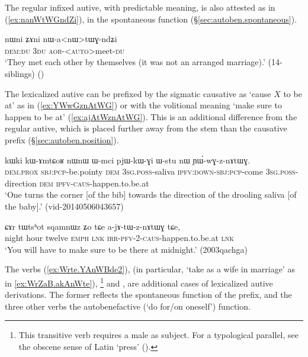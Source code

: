 The regular infixed autive, with predictable meaning, is also attested as in  (\ref{ex:nanWtWGndZi}), in the spontaneous function (§\ref{sec:autoben.spontaneous}).

\begin{exe}
\ex \label{ex:nanWtWGndZi}
\gll nɯni ʑɤni nɯ-a<nɯ>tɯɣ-ndʑi \\
\textsc{dem}:\textsc{du} \textsc{3du}
\textsc{aor}-<\textsc{auto}>meet-\textsc{du} \\
\glt `They met each other by themselves (it was not an arranged marriage).' (14-siblings) ()
\end{exe}

The lexicalized autive  can be prefixed by the sigmatic causative as  `cause $X$ to be at' as in (\ref{ex:YWwGznAtWG}) or with the volitional meaning `make sure to happen to be at' (\ref{ex:ajAtWznAtWG}). This is an additional difference from the regular autive, which is placed further away from the stem than the causative prefix (§\ref{sec:autoben.position}).

\begin{exe}
\ex \label{ex:YWwGznAtWG}
\gll kɯki kɯ-ɤmtɕoʁ nɯnɯ ɯ-mci pjɯ-kɯ-ɣi ɯ-stu nɯ ɲɯ́-wɣ-z-nɤtɯɣ. \\
\textsc{dem}.\textsc{prox} \textsc{sbj}:\textsc{pcp}-be.pointy \textsc{dem} \textsc{3sg}.\textsc{poss}-saliva \textsc{ipfv}:\textsc{down}-\textsc{sbj}:\textsc{pcp}-come \textsc{3sg}.\textsc{poss}-direction \textsc{dem} \textsc{ipfv}-\textsc{caus}-happen.to.be.at \\
\glt `One turns the corner [of the bib] towards the direction of the drooling saliva [of the baby].' (vid-20140506043657)
\end{exe}

\begin{exe}
\ex \label{ex:ajAtWznAtWG}
\gll ɕɤr tɯtsʰot sqamnɯz ʑo tɕe a-jɤ-tɯ-z-nɤtɯɣ tɕe, \\
 night hour twelve \textsc{emph} \textsc{lnk}  \textsc{irr}-\textsc{pfv}-2-\textsc{caus}-happen.to.be.at \textsc{lnk} \\
\glt `You will have to make sure to be there at midnight.' (2003qachga)
\end{exe}
 

The verbs  (\ref{ex:Wrte.YAnWBde2}),  (in particular, `take as a wife in marriage' as in \ref{ex:WrZaB.akAnWte}), \footnote{This transitive verb requires a male as subject. For a typological parallel, see the obscene sense of Latin  `press' (\citealt[182]{adams90latin}). } and , are additional cases of lexicalized autive derivations. The former  reflects the spontaneous function of the  prefix, and the three other verbs the autobenefactive (`do for/on oneself') function.
  
